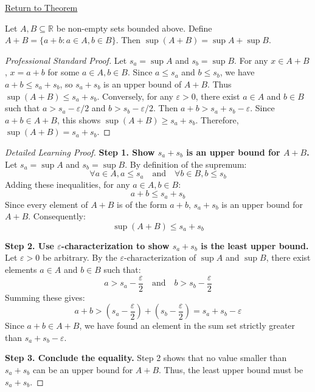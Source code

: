 \newpage
{}
\label{prf:supremum-sum-set}

\begin{remark*}[Return]
\hyperref[thm:supremum-sum-set]{Return to Theorem}
\end{remark*}

\begin{theorem*}
Let $A, B \subseteq \mathbb{R}$ be non-empty sets bounded above. Define $A + B = \{a + b : a \in A, b \in B\}$. Then $\sup(A + B) = \sup A + \sup B$.
\end{theorem*}

\begin{proof}[Professional Standard Proof]
\LRAProofBodyStart
Let $s_a = \sup A$ and $s_b = \sup B$. For any $x \in A+B$, $x = a+b$ for some $a \in A, b \in B$. Since $a \le s_a$ and $b \le s_b$, we have $a+b \le s_a + s_b$, so $s_a + s_b$ is an upper bound of $A+B$. Thus $\sup(A+B) \le s_a + s_b$. Conversely, for any $\varepsilon > 0$, there exist $a \in A$ and $b \in B$ such that $a > s_a - \varepsilon/2$ and $b > s_b - \varepsilon/2$. Then $a+b > s_a + s_b - \varepsilon$. Since $a+b \in A+B$, this shows $\sup(A+B) \ge s_a + s_b$. Therefore, $\sup(A+B) = s_a + s_b$.
\end{proof}

\begin{proof}[Detailed Learning Proof]
\LRAProofBodyStart

\textbf{Step 1. Show $s_a + s_b$ is an upper bound for $A+B$.}
Let $s_a = \sup A$ and $s_b = \sup B$. By definition of the supremum:
\[ \forall a \in A, a \le s_a \quad \text{and} \quad \forall b \in B, b \le s_b \]
Adding these inequalities, for any $a \in A, b \in B$:
\[ a + b \le s_a + s_b \]
Since every element of $A+B$ is of the form $a+b$, $s_a + s_b$ is an upper bound for $A+B$. Consequently:
\[ \sup(A+B) \le s_a + s_b \]

\textbf{Step 2. Use $\varepsilon$-characterization to show $s_a + s_b$ is the least upper bound.}
Let $\varepsilon > 0$ be arbitrary. By the $\varepsilon$-characterization of $\sup A$ and $\sup B$, there exist elements $a \in A$ and $b \in B$ such that:
\[ a > s_a - \frac{\varepsilon}{2} \quad \text{and} \quad b > s_b - \frac{\varepsilon}{2} \]
Summing these gives:
\[ a + b > (s_a - \frac{\varepsilon}{2}) + (s_b - \frac{\varepsilon}{2}) = s_a + s_b - \varepsilon \]
Since $a+b \in A+B$, we have found an element in the sum set strictly greater than $s_a + s_b - \varepsilon$.

\textbf{Step 3. Conclude the equality.}
Step 2 shows that no value smaller than $s_a + s_b$ can be an upper bound for $A+B$. Thus, the least upper bound must be $s_a + s_b$.
\end{proof}

